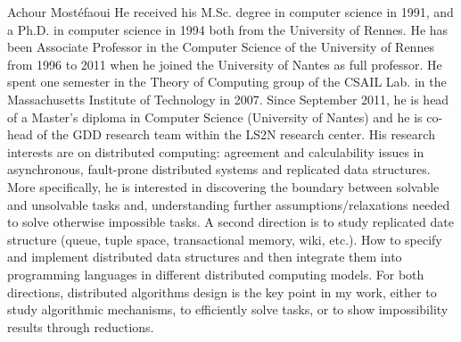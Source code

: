 \begin{IEEEbiography}
{Achour Most{\'e}faoui} He received his M.Sc. degree in computer science in
1991, and a Ph.D. in computer science in 1994 both from the University of
Rennes. He has been Associate Professor in the Computer Science of the
University of Rennes from 1996 to 2011 when he joined the University of Nantes
as full professor.  He spent one semester in the Theory of Computing group of
the CSAIL Lab. in the Massachusetts Institute of Technology in 2007.  Since
September 2011, he is head of a Master's diploma in Computer Science (University
of Nantes) and he is co-head of the GDD research team within the LS2N research
center.  His research interests are on distributed computing: agreement and
calculability issues in asynchronous, fault-prone distributed systems and
replicated data structures.  More specifically, he is interested in discovering
the boundary between solvable and unsolvable tasks and, understanding further
assumptions/relaxations needed to solve otherwise impossible tasks.  A second
direction is to study replicated date structure (queue, tuple space,
transactional memory, wiki, etc.).  How to specify and implement distributed
data structures and then integrate them into programming languages in different
distributed computing models. For both directions, distributed algorithms design
is the key point in my work, either to study algorithmic mechanisms, to
efficiently solve tasks, or to show impossibility results through reductions.
\end{IEEEbiography}

